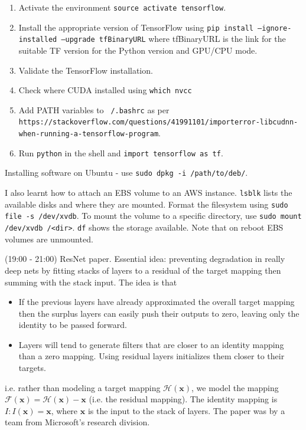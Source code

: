 \documentclass[idxtotoc,hyperref,openany]{labbook} %
\begin{document}
\begin{enumerate}
	\item Activate the environment \texttt{source activate tensorflow}.
	\item Install the appropriate version of TensorFlow using \texttt{pip install --ignore-installed --upgrade tfBinaryURL} where tfBinaryURL is the link for the suitable TF version for the Python version and GPU/CPU mode.
	\item Validate the TensorFlow installation.
	\item Check where CUDA installed using \texttt{which nvcc}
	\item Add PATH variables to \texttt{~/.bashrc} as per \texttt{https://stackoverflow.com/questions/41991101/importerror-libcudnn-when-running-a-tensorflow-program}.
	\item Run \texttt{python} in the shell and \texttt{import tensorflow as tf}.
\end{enumerate}
Installing software on Ubuntu - use \texttt{sudo dpkg -i /path/to/deb/}.

I also learnt how to attach an EBS volume to an AWS instance. \texttt{lsblk} lists the available disks and where they are mounted. Format the filesystem using \texttt{sudo file -s /dev/xvdb}. To mount the volume to a specific directory, use \texttt{sudo mount /dev/xvdb /<dir>}. \texttt{df} shows the storage available. Note that on reboot EBS volumes are unmounted.

(19:00 - 21:00) ResNet paper. Essential idea: preventing degradation in really deep nets by fitting stacks of layers to a residual of the target mapping then summing with the stack input. The idea is that
\begin{itemize}
	\item If the previous layers have already approximated the overall target mapping then the surplus layers can easily push their outputs to zero, leaving only the identity to be passed forward.
	\item Layers will tend to generate filters that are closer to an identity mapping than a zero mapping. Using residual layers initializes them closer to their targets.
\end{itemize}
i.e. rather than modeling a target mapping $\mathcal{H}(\mathbf{x})$, we model the mapping $\mathcal{F}(\mathbf{x}) = \mathcal{H}(\mathbf{x}) - \mathbf{x}$ (i.e. the residual mapping). The identity mapping is $I : I(\mathbf{x}) = \mathbf{x}$, where $\mathbf{x}$ is the input to the stack of layers. The paper was by a team from Microsoft's research division.
\end{document}
